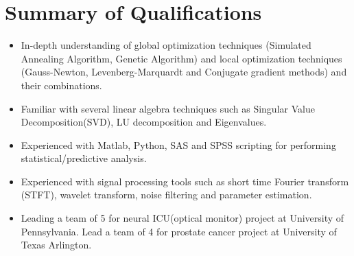 \documentclass{my_cv}
\begin{document}
\vspace{-2mm}
\begin{center} 
\begin{footnotesize}
\end{footnotesize}

\href{https://www.linkedin.com/in/venkaiahchowdarykavuri}{\textcolor{linkedincolor}{\faLinkedinSquare}} \href{https://github.com/Venki-Kavuri}{\faGithub} \href{https://scholar.google.com/citations?hl=en&user=r5E9ACIAAAAJ&view_op=list_works}{\textcolor{gscholarcolor}{\aiGoogleScholar}} \href{https://www.facebook.com/venki.kavuri}{\textcolor{facebookcolor}{\faFacebookOfficial}}
\end{center} 

\vspace{-9mm} 

\section{Summary of Qualifications}
\begin{itemize}\itemsep -1mm

\item In-depth understanding of global optimization techniques (Simulated Annealing Algorithm, Genetic Algorithm) and local optimization techniques (Gauss-Newton, Levenberg-Marquardt and Conjugate gradient methods) and their combinations.

\item Familiar with several linear algebra techniques such as Singular Value Decomposition(SVD), LU decomposition and Eigenvalues. 

\item Experienced with Matlab, Python, SAS and SPSS scripting for performing statistical/predictive analysis.

\item Experienced with signal processing tools such as short time Fourier transform (STFT), wavelet transform, noise filtering and parameter estimation.

\item Leading a team of 5 for neural ICU(optical monitor) project at University of Pennsylvania. Lead a team of 4 for prostate cancer project at University of Texas Arlington.  


\end{itemize}
\vspace{-7mm}
\end{document}
